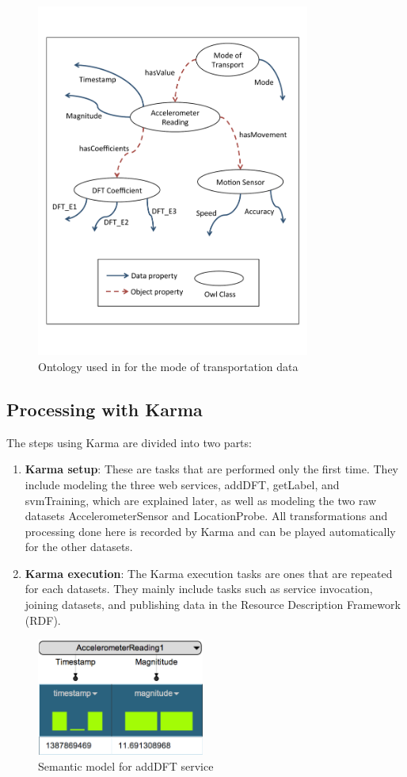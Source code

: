 \begin{figure}[h]
\centering
\includegraphics[width=90mm]{img/ontology.pdf}
\caption{Ontology used in for the mode of transportation data\label{fig:ontology}}
\end{figure}

\subsection{Processing with Karma}
The steps using Karma are divided into two parts:
\begin{enumerate}
  \item \textbf{Karma setup}: These are tasks that are performed only the first time. They include modeling the three web services, addDFT, getLabel, and svmTraining, which are explained later, as well as modeling the two raw datasets AccelerometerSensor and LocationProbe. All transformations and processing done here is recorded by Karma and can be played automatically for the other datasets. 
  \item \textbf{Karma execution}: The Karma execution tasks are ones that are repeated for each datasets. They mainly include tasks such as service invocation, joining datasets, and publishing data in the Resource Description Framework (RDF).
\end{enumerate} 

\begin{figure}[bp]
\centering
\includegraphics[width=55mm]{img/DFTservice}
\caption{Semantic model for addDFT service\label{fig:dftService}}
\end{figure}

